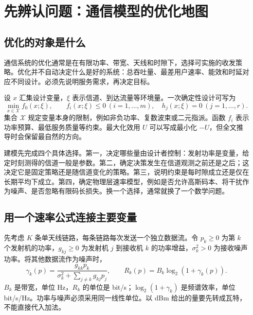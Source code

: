 \chapter{先辨认问题：通信模型的优化地图}\label{ch:models}

\section{优化的对象是什么}
通信系统的优化通常是在有限功率、带宽、天线和时隙下，选择可实施的收发策略。优化并不自动决定什么是好的系统：总吞吐量、最差用户速率、能效和时延对应不同设计。必须先说明服务需求，再决定目标。

设 $x$ 汇集设计变量，$\xi$ 表示信道、到达流量等环境量。一次确定性设计可写为
\begin{equation}\label{eq:general}
 \min_{x\in\mathcal X} f_0(x;\xi),\qquad
 f_i(x;\xi)\le0\ (i=1,\ldots,m),\quad
 h_j(x;\xi)=0\ (j=1,\ldots,r).
\end{equation}
集合 $\mathcal X$ 规定变量本身的限制，例如非负功率、复数波束或二元指派。函数 $f_i$ 表示功率预算、最低服务质量等约束。最大化效用 $U$ 可以写成最小化 $-U$，但全文推导时会保留最自然的方向。

建模先完成四个具体选择。第一，决定哪些量由设计者控制：发射功率是变量，给定时刻测得的信道一般是参数。第二，确定决策发生在信道观测之前还是之后；这决定它是固定策略还是随信道变化的策略。第三，说明约束是每时隙成立还是仅在长期平均下成立。第四，确定物理层速率模型，例如是否允许高斯码本、将干扰作为噪声、是否忽略有限码长损失。换一个选择，通常就换了一个数学问题。

\section{用一个速率公式连接主要变量}
先考虑 $K$ 条单天线链路，每条链路每次发送一个独立数据流。令 $p_k\ge0$ 为第 $k$ 个发射机的功率，$g_{kj}\ge0$ 为发射机 $j$ 到接收机 $k$ 的功率增益，$\sigma_k^2>0$ 为接收噪声功率。将其他数据流作为噪声时，
\begin{equation}\label{eq:sinr-basic}
 \gamma_k(p)=\frac{g_{kk}p_k}{\sigma_k^2+\sum_{j\ne k}g_{kj}p_j},\qquad
 R_k(p)=B_k\log_2(1+\gamma_k(p)).
\end{equation}
$B_k$ 是带宽，单位 Hz，$R_k$ 的单位是 bit/s；$\log_2(1+\gamma_k)$ 是频谱效率，单位 bit/s/Hz。功率与噪声必须采用同一线性单位。以 dBm 给出的量要先转成瓦特，不能直接代入加法。

